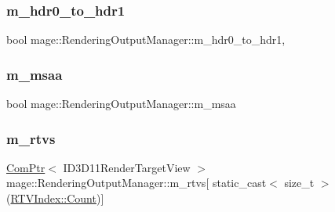 \hypertarget{classmage_1_1_rendering_output_manager_ae2164d5657239162591cdcdefa75e240}{}\label{classmage_1_1_rendering_output_manager_ae2164d5657239162591cdcdefa75e240} 
\subsubsection{\texorpdfstring{m\+\_\+hdr0\+\_\+to\+\_\+hdr1}{m\_hdr0\_to\_hdr1}}
{\footnotesize\ttfamily bool mage\+::\+Rendering\+Output\+Manager\+::m\+\_\+hdr0\+\_\+to\+\_\+hdr1\hspace{0.3cm}{\ttfamily [mutable]}, {\ttfamily [private]}}

\hypertarget{classmage_1_1_rendering_output_manager_ab28e6451a0c2eb918b63ae312018ffe1}{}\label{classmage_1_1_rendering_output_manager_ab28e6451a0c2eb918b63ae312018ffe1} 
\subsubsection{\texorpdfstring{m\+\_\+msaa}{m\_msaa}}
{\footnotesize\ttfamily bool mage\+::\+Rendering\+Output\+Manager\+::m\+\_\+msaa\hspace{0.3cm}{\ttfamily [private]}}

\hypertarget{classmage_1_1_rendering_output_manager_a319f9b33395053ea23be97768410942c}{}\label{classmage_1_1_rendering_output_manager_a319f9b33395053ea23be97768410942c} 
\subsubsection{\texorpdfstring{m\+\_\+rtvs}{m\_rtvs}}
{\footnotesize\ttfamily \hyperlink{namespacemage_ae74f374780900893caa5555d1031fd79}{Com\+Ptr}$<$ I\+D3\+D11\+Render\+Target\+View $>$ mage\+::\+Rendering\+Output\+Manager\+::m\+\_\+rtvs\mbox{[} static\+\_\+cast$<$ size\+\_\+t $>$(\hyperlink{classmage_1_1_rendering_output_manager_a776a03191e0a424d8e014414d9d44cefae93f994f01c537c4e2f7d8528c3eb5e9}{R\+T\+V\+Index\+::\+Count})\mbox{]}\hspace{0.3cm}{\ttfamily [private]}}

